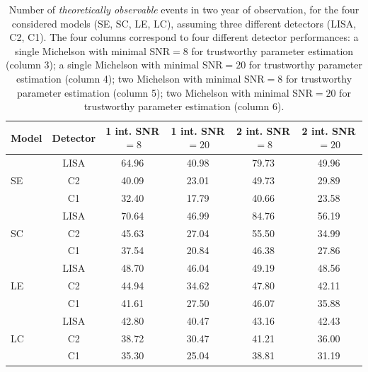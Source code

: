 \documentclass{iopart}
\begin{document}
\begin{table}
\begin{center}
\begin{tabular}{l|c|cccc}
\hline
Model & Detector  &  1 int. SNR$=8$ & 1 int. SNR$=20$ & 2 int. SNR$=8$ & 2 int. SNR$=20$\\
\hline
   & LISA & 64.96 &     40.98 &     79.73 &     49.96\\
SE & C2   & 40.09 &     23.01 &     49.73 &     29.89\\
   & C1   & 32.40 &     17.79 &     40.66 &     23.58\\
\hline				
   & LISA & 70.64 &     46.99 &     84.76 &     56.19\\
SC & C2   & 45.63 &     27.04 &     55.50 &     34.99\\
   & C1   & 37.54 &     20.84 &     46.38 &     27.86\\
\hline				
   & LISA & 48.70 &     46.04 &     49.19 &     48.56\\
LE & C2   & 44.94 &     34.62 &     47.80 &     42.11\\
   & C1   & 41.61 &     27.50 &     46.07 &     35.88\\
\hline				
   & LISA & 42.80 &     40.47 &     43.16 &     42.43\\
LC & C2   & 38.72 &     30.47 &     41.21 &     36.00\\
   & C1   & 35.30 &     25.04 &     38.81 &     31.19\\
\hline				
\end{tabular}
\end{center}
\caption{Number of {\it theoretically observable} events in two year of observation, for the four considered models (SE, SC, LE, LC), assuming three different detectors (LISA, C2, C1). The four columns correspond to four different detector performances: a single Michelson with minimal SNR$=8$ for trustworthy parameter estimation (column 3); a single Michelson with minimal SNR$=20$ for trustworthy parameter estimation (column 4); two Michelson with minimal SNR$=8$ for trustworthy parameter estimation (column 5); two Michelson with minimal SNR$=20$ for trustworthy parameter estimation (column 6).}
\label{tabI}
\end{table}
\end{document}
